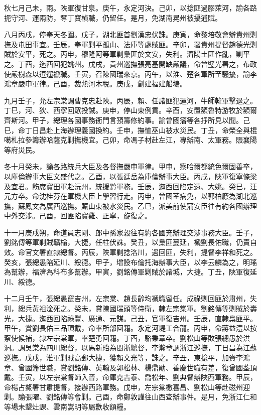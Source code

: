 \begin{pinyinscope}
秋七月己未，雨。陜軍復甘泉。庚午，永定河決。己卯，以捻匪過膠萊河，諭各路扼守河、運兩防，奪丁寶楨職，仍留任。是月，免湖南晃州被擾逋賦。

八月丙戌，停奉天冬圍。戊子，湖北匪首劉漢忠伏誅。庚寅，命黎培敬會辦貴州剿撫及屯田事宜。壬辰，奉軍剿平孤山、法庫等處賊匪。辛卯，署貴州提督趙德光剿賊於安平，死之。丙申，穆隆阿等軍剿梟匪於文安，失利。濟陽土匪作亂，剿平之。丁酉，迤西回犯姚州。戊戌，貴州巡撫張亮基開缺嚴議，命曾璧光署之，布政使嚴樹森以逗遛褫職。壬寅，召陳國瑞來京。丙午，以淮、楚各軍所至騷擾，諭李鴻章嚴申軍律。己酉，裁熱河木稅。庚戌，創建福建船塢。

九月壬子，允左宗棠調曹克忠赴陜。丙辰，賴、任諸匪犯運河，牛師韓軍擊退之。丁巳，河、狄、西寧回眾投誠。庚申，停山東例貢。辛酉，安置額魯特游牧於額爾齊斯河。甲子，總理各國事務衙門言預籌修約事。諭曾國籓等各抒所見以聞。己巳，命丁日昌赴上海辦理義國換約。壬申，撫恤巫山被水災民。丁丑，命榮全與棍噶札拉參籌辦哈薩克剿撫機宜。己卯，命馮子材赴左江，專辦南、太軍務。賑襄陽等府災民。

冬十月癸未，諭各路統兵大臣及各督撫嚴申軍律。甲申，察哈爾都統色爾固善卒，以庫倫辦事大臣文盛代之。乙酉，以張廷岳為庫倫辦事大臣。丙戌，陜軍復寧條梁及宜君。飭席寶田軍赴沅州，統援黔軍務。壬辰，迤西回陷定遠、大姚。癸巳，汪元方卒。命沈桂芬在軍機大臣上學習行走。丙申，曾國荃病免，以郭柏廕為湖北巡撫，蘇鳳文為廣西巡撫。賑山東被水災民。乙巳，派美前使蒲安臣往有約各國辦理中外交涉。己酉，回匪陷寶雞、正寧，旋復之。

十一月庚戌朔，命道員志剛、郎中孫家穀往有約各國充辦理交涉事務大臣。壬子，劉銘傳等軍剿賊贛榆，大捷，任柱伏誅。癸丑，以梟匪蔓延，褫劉長佑職，仍責自效。命官文署直隸總督。丙辰，陜軍剿捻洛川，遇回匪，失利，提督李祥和死之。癸亥，張總愚陷延川、綏德。甲子，增設布倫托海辦事大臣，以李云麟為之，明瑤為幫辦，福濟為科布多幫辦。甲寅，劉銘傳軍剿賊於諸城，大捷。丁丑，陜軍復延川、綏德。

十二月壬午，張總愚竄吉州，左宗棠、趙長齡均褫職留任。成祿剿回匪於肅州，失利，總兵黃祖淦死之。癸未，賞陳國瑞頭等侍衛，隸左宗棠軍。劉銘傳等剿賊於壽光，大捷。迤西回陷祿豐、廣通、元謀。己丑，官軍復吉州。壬辰，直隸梟匪平。甲午，賞劉長佑三品頂戴，命率所部回籍。永定河堤工合龍。丙申，命蔣益澧以按察使候補，隸左宗棠軍，率楚勇回籍。丁酉，駱秉章卒。劉松山等敗張總愚於洪洞。調吳棠為四川總督，以馬新貽為閩浙總督，李瀚章調浙江巡撫，丁日昌為江蘇巡撫。戊戌，淮軍剿賊高郵大捷，獲賴文光等，誅之。辛丑，東捻平，加賚李鴻章、曾國籓世職，賞劉銘傳、英翰及郭松林、楊鼎勛、善慶世職有差，復曾國荃頂戴。壬寅，以左宗棠督師入晉，命庫克吉泰、喬松年、劉典督辦陜西軍務。甲辰，命楊占鰲署甘肅提督，接辦西路軍務。戊申，左宗棠檄喜昌、劉松山等赴磁州迎剿。諭張曜、劉銘傳等會剿。己酉，命鄭敦謹往山西查辦事件。是月，免浙江仁和等場未墾灶課、雲南嵩明等屬歉收額糧。


\end{pinyinscope}
